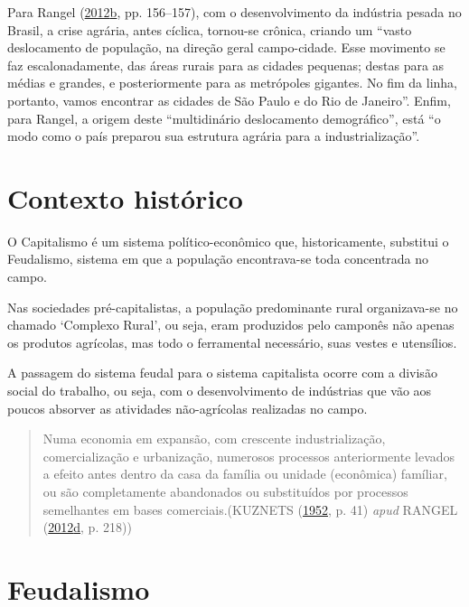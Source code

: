 \documentclass[a4paper, 12pt]{article}
\begin{document}
Para Rangel
(\protect\hyperlink{ref-rangel1988}{2012}\protect\hyperlink{ref-rangel1988}{b},
pp. 156--157), com o desenvolvimento da indústria pesada no Brasil, a
crise agrária, antes cíclica, tornou-se crônica, criando um ``vasto
deslocamento de população, na direção geral campo-cidade. Esse movimento
se faz escalonadamente, das áreas rurais para as cidades pequenas;
destas para as médias e grandes, e posteriormente para as metrópoles
gigantes. No fim da linha, portanto, vamos encontrar as cidades de São
Paulo e do Rio de Janeiro''. Enfim, para Rangel, a origem deste
``multidinário deslocamento demográfico'', está ``o modo como o país
preparou sua estrutura agrária para a industrialização''.

\hypertarget{contexto-historico}{%
\section{Contexto histórico}\label{contexto-historico}}

O Capitalismo é um sistema político-econômico que, historicamente,
substitui o Feudalismo, sistema em que a população encontrava-se toda
concentrada no campo.

Nas sociedades pré-capitalistas, a população predominante rural
organizava-se no chamado `Complexo Rural', ou seja, eram produzidos pelo
camponês não apenas os produtos agrícolas, mas todo o ferramental
necessário, suas vestes e utensílios.

A passagem do sistema feudal para o sistema capitalista ocorre com a
divisão social do trabalho, ou seja, com o desenvolvimento de indústrias
que vão aos poucos absorver as atividades não-agrícolas realizadas no
campo.

\begin{quote}
Numa economia em expansão, com crescente industrialização,
comercialização e urbanização, numerosos processos anteriormente levados
a efeito antes dentro da casa da família ou unidade (econômica)
famíliar, ou são completamente abandonados ou substituídos por processos
semelhantes em bases comerciais.(KUZNETS
(\protect\hyperlink{ref-kuznets}{1952}, p. 41) \emph{apud} RANGEL
(\protect\hyperlink{ref-rangel1956}{2012}\protect\hyperlink{ref-rangel1956}{d},
p. 218))
\end{quote}

\hypertarget{feudalismo}{%
\section{Feudalismo}\label{feudalismo}}
\end{document}
